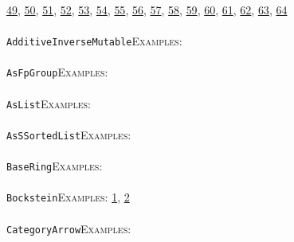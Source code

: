\documentclass[a4paper,11pt]{report}
\begin{document}
{{\href{../www/SideLinks/About/aboutSpaceGroup.html} {49}{\nobreakspace}, \href{../www/SideLinks/About/aboutFunctorial.html} {50}{\nobreakspace}, \href{../www/SideLinks/About/aboutSuperperfect.html} {51}{\nobreakspace}, \href{../www/SideLinks/About/aboutGouter.html} {52}{\nobreakspace}, \href{../www/SideLinks/About/aboutSurvey.html} {53}{\nobreakspace}, \href{../www/SideLinks/About/aboutGraphsOfGroups.html} {54}{\nobreakspace}, \href{../www/SideLinks/About/aboutTDA.html} {55}{\nobreakspace}, \href{../www/SideLinks/About/aboutIntro.html} {56}{\nobreakspace}, \href{../www/SideLinks/About/aboutKnots.html} {57}{\nobreakspace}, \href{../www/SideLinks/About/aboutTensorSquare.html} {58}{\nobreakspace}, \href{../www/SideLinks/About/aboutKnotsQuandles.html} {59}{\nobreakspace}, \href{../www/SideLinks/About/aboutTopology.html} {60}{\nobreakspace}, \href{../www/SideLinks/About/aboutLieCovers.html} {61}{\nobreakspace}, \href{../www/SideLinks/About/aboutTorAndExt.html} {62}{\nobreakspace}, \href{../www/SideLinks/About/aboutLie.html} {63}{\nobreakspace}, \href{../www/SideLinks/About/aboutTwistedCoefficients.html} {64}{\nobreakspace} \\
 \\
 \texttt{AdditiveInverseMutable}{\nobreakspace}{\nobreakspace}{\nobreakspace}{\nobreakspace}\textsc{Examples:} \\
 \\
 \texttt{AsFpGroup}{\nobreakspace}{\nobreakspace}{\nobreakspace}{\nobreakspace}\textsc{Examples:} \\
 \\
 \texttt{AsList}{\nobreakspace}{\nobreakspace}{\nobreakspace}{\nobreakspace}\textsc{Examples:} \\
 \\
 \texttt{AsSSortedList}{\nobreakspace}{\nobreakspace}{\nobreakspace}{\nobreakspace}\textsc{Examples:} \\
 \\
 \texttt{BaseRing}{\nobreakspace}{\nobreakspace}{\nobreakspace}{\nobreakspace}\textsc{Examples:} \\
 \\
 \texttt{Bockstein}{\nobreakspace}{\nobreakspace}{\nobreakspace}{\nobreakspace}\textsc{Examples:} \href{tutorial/chap7.html} {1}{\nobreakspace}, \href{../www/SideLinks/About/aboutModPRings.html} {2}{\nobreakspace} \\
 \\
 \texttt{CategoryArrow}{\nobreakspace}{\nobreakspace}{\nobreakspace}{\nobreakspace}\textsc{Examples:} \\
}}
\end{document}
